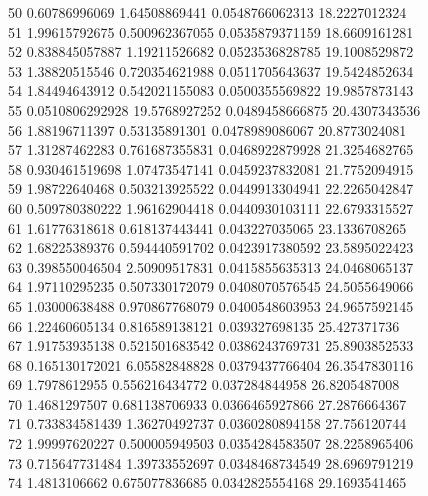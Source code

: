 {50 0.60786996069 1.64508869441 0.0548766062313 18.2227012324 \\
51 1.99615792675 0.500962367055 0.0535879371159 18.6609161281 \\
52 0.838845057887 1.19211526682 0.0523536828785 19.1008529872 \\
53 1.38820515546 0.720354621988 0.0511705643637 19.5424852634 \\
54 1.84494643912 0.542021155083 0.0500355569822 19.9857873143 \\
55 0.0510806292928 19.5768927252 0.0489458666875 20.4307343536 \\
56 1.88196711397 0.53135891301 0.0478989086067 20.8773024081 \\
57 1.31287462283 0.761687355831 0.0468922879928 21.3254682765 \\
58 0.930461519698 1.07473547141 0.0459237832081 21.7752094915 \\
59 1.98722640468 0.503213925522 0.0449913304941 22.2265042847 \\
60 0.509780380222 1.96162904418 0.0440930103111 22.6793315527 \\
61 1.61776318618 0.618137443441 0.043227035065 23.1336708265 \\
62 1.68225389376 0.594440591702 0.0423917380592 23.5895022423 \\
63 0.398550046504 2.50909517831 0.0415855635313 24.0468065137 \\
64 1.97110295235 0.507330172079 0.0408070576545 24.5055649066 \\
65 1.03000638488 0.970867768079 0.0400548603953 24.9657592145 \\
66 1.22460605134 0.816589138121 0.039327698135 25.427371736 \\
67 1.91753935138 0.521501683542 0.0386243769731 25.8903852533 \\
68 0.165130172021 6.05582848828 0.0379437766404 26.3547830116 \\
69 1.7978612955 0.556216434772 0.037284844958 26.8205487008 \\
70 1.4681297507 0.681138706933 0.0366465927866 27.2876664367 \\
71 0.733834581439 1.36270492737 0.0360280894158 27.756120744 \\
72 1.99997620227 0.500005949503 0.0354284583507 28.2258965406 \\
73 0.715647731484 1.39733552697 0.0348468734549 28.6969791219 \\
74 1.4813106662 0.675077836685 0.0342825554168 29.1693541465 \\
}
